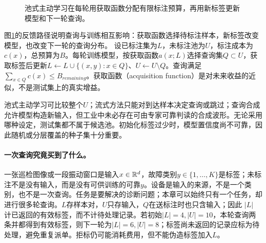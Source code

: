 \begin{figure}[htbp]
\centering
{}
\caption{池式主动学习在每轮用获取函数分配有限标注预算，再用新标签更新模型和下一轮查询。}
\label{fig:active-query-loop}
\end{figure}
图\ref{fig:active-query-loop}的反馈路径说明查询与训练相互影响：获取函数选择待标注样本，新标签改变模型，也改变下一轮的查询分布。
设已标注集为$L$，未标注池为$U$，标注成本为$c(x)$，总预算为$B$。每轮训练模型，按获取函数$a(x;L)$选择查询集$Q\subset U$，获取标签后更新$L\leftarrow L\cup\{(x,y):x\in Q\}$、$U\leftarrow U\setminus Q$。查询满足$\sum_{x\in Q}c(x)\leq B_{remaining}$。获取函数（acquisition function）是对未来收益的近似，不是测试集上的真实增益\cite{settles2009active}。

池式主动学习可比较整个$U$；流式方法只能对到达样本决定查询或跳过；查询合成允许模型构造新输入，但工业中未必存在可由专家可靠判读的合成波形。无论采用哪种设定，测试集都不属于候选池。初始化标签过少时，模型置信度尚不可靠，因此随机或分层覆盖的种子集十分重要。

\paragraph{一次查询究竟买到了什么。}
一张巡检图像或一段振动窗口是输入$x\in\mathbb{R}^d$，故障类别$y\in\{1,\ldots,K\}$是标签；未标注不是没有输入，而是没有可供训练的可靠$y$。设备是输入的来源，不是一个类别，也不是一次查询。任务是要解决的诊断问题；本章可以始终只有一个任务，却进行很多轮查询。$L$存样本对，$U$只存输入，$Q$在送标注时也只含输入；因此 $|L|$ 计已返回的有效标签，而不计待处理记录。若初始$|L|=4,|U|=10$，本轮查询两条并都得到有效标签，则下一轮为$|L|=6,|U|=8$；标签尚未返回的记录应标为待处理，避免重复派单。拒标仍可能消耗费用，但不能伪造标签加入$L$。

